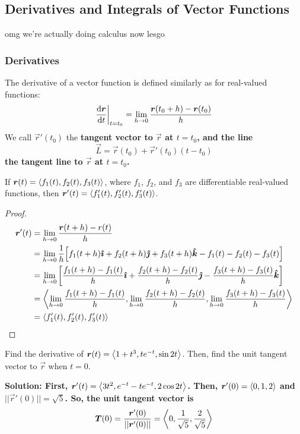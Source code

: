\subsection{Derivatives and Integrals of Vector Functions}
omg we're actually doing calculus now lesgo
\subsubsection{Derivatives}
The derivative of a vector function is defined similarly as for real-valued functions:
\[ \dv{\boldsymbol{r}}{t}\biggr|_{t=t_0} = \lim_{h\to 0}\frac{\boldsymbol{r}(t_0 + h) - \boldsymbol{r}(t_0)}{h}\]
We call \(\vec r'(t_0)\) the \bf{tangent vector} to \(\vec r\) at \(t=t_0\), and the line \[ \vec L = \vec r(t_0) + \vec r'(t_0)(t-t_0) \] the \bf{tangent line} to \(\vec r\) at \(t=t_0\).
\begin{theorem}
    If \(\boldsymbol{r}(t)=\left\langle f_1(t), f_2(t), f_3(t)\right\rangle\), where \(f_1\), \(f_2\), and \(f_3\) are differentiable real-valued functions, then \(\boldsymbol{r}'(t) = \left\langle f_1'(t), f_2'(t), f_3'(t)\right\rangle\).
\end{theorem}
\begin{proof}
    \begin{align*}
        \vec r'(t) &= \lim_{h\to 0}\frac{\vec r(t + h) - r(t)}{h} \\
        &= \lim_{h\to 0}\frac{1}{h}\bqty{f_1(t+h)\ihat + f_2(t+h)\jhat + f_3(t+h)\khat - f_1(t) - f_2(t) - f_3(t)} \\
        &= \lim_{h\to 0}\bqty{\frac{f_1(t+h)-f_1(t)}{h}\ihat + \frac{f_2(t+h)-f_2(t)}{h}\jhat-\frac{f_3(t+h)-f_3(t)}{h}\khat} \\
        &= \<\lim_{h\to 0}\frac{f_1(t+h)-f_1(t)}{h}, \lim_{h\to 0}\frac{f_2(t+h)-f_2(t)}{h}, \lim_{h\to 0}\frac{f_3(t+h)-f_3(t)}{h} \> \\
        &= \< f_1'(t), f_2'(t), f_3'(t) \>
    \end{align*}
\end{proof}
\begin{example}
    Find the derivative of \(\boldsymbol{r}(t) = \left\langle1 + t^3, te^{-t}, \sin 2t \right\rangle\). Then, find the unit tangent vector to \(\vec r\) when \(t=0\). \par\bf{Solution: }First, \(\boldsymbol{r}'(t)=\left\langle3t^2, e^{-t}-te^{-t}, 2\cos 2t\right\rangle\). Then, \(\boldsymbol{r}'(0) = \left\langle0, 1, 2\right\rangle\) and \(||\vec r'(0)||=\sqrt{5}\). So, the unit tangent vector is \[\boldsymbol{T}(0)=\frac{\boldsymbol{r}'(0)}{||\boldsymbol{r}'(0)||} = \left\langle0, \frac{1}{\sqrt 5}, \frac{2}{\sqrt 5} \right\rangle\]
\end{example}
